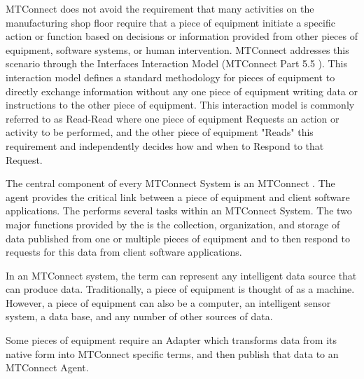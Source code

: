 MTConnect does not avoid the requirement that many activities on the manufacturing shop floor require that a piece of equipment initiate a specific action or function based on decisions or information provided from other pieces of equipment, software systems, or human intervention.   MTConnect addresses this scenario through the Interfaces Interaction Model (MTConnect Part 5.5 \cite{MTCPart5}).   This interaction model defines a standard methodology for pieces of equipment to directly exchange information without any one piece of equipment writing data or instructions to the other piece of equipment. This interaction model is commonly referred to as Read-Read where one piece of equipment Requests an action or activity to be performed, and the other piece of equipment "Reads" this requirement and independently decides how and when to Respond to that Request. 

The central component of every MTConnect System is an MTConnect .  The agent provides the critical link between a piece of equipment and client software applications. The  performs several tasks within an MTConnect System.   The two major functions provided by the  is the collection, organization, and storage of data published from one or multiple pieces of equipment and to then respond to requests for this data from client software applications. 


\FloatBarrier
 
In an MTConnect system, the term  can represent any intelligent data source that can produce data.  Traditionally, a piece of equipment is thought of as a machine. However, a piece of equipment can also be a computer, an intelligent sensor system, a data base, and any number of other sources of data. 
 
Some pieces of equipment require an Adapter which transforms data from its native form into MTConnect specific terms, and then publish that data to an MTConnect Agent.